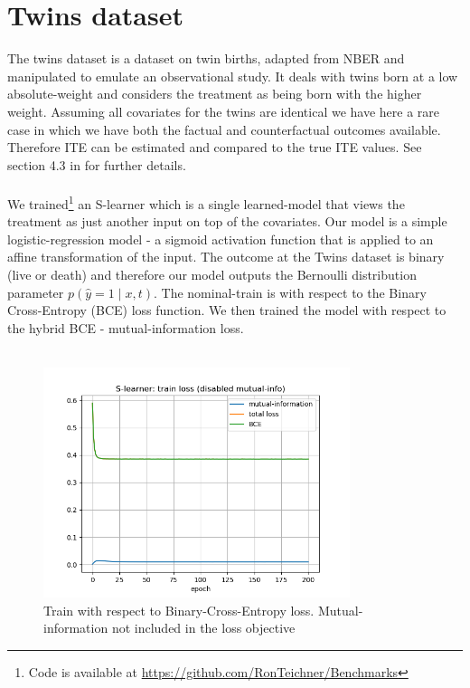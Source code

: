 \documentclass[oneside,12pt]{article}
\begin{document}
\section{Twins dataset}\label{sec:twins}
%
The twins dataset is a dataset on twin births, adapted from NBER and manipulated to emulate an observational study. It deals with twins born at a low absolute-weight and considers the treatment as being born with the higher weight. Assuming all covariates for the twins are identical we have here a rare case in which we have both the factual and counterfactual outcomes available. Therefore ITE can be estimated and compared to the true ITE values. See section 4.3 in \cite{NIPS2017_7223} for further details.\\\\
%
We trained\footnote{Code is available at \href{https://github.com/RonTeichner/Benchmarks}{https://github.com/RonTeichner/Benchmarks}} an S-learner \cite{Knzel4156} which is a single learned-model that views the treatment as just another input on top of the covariates. Our model is a simple logistic-regression model - a sigmoid activation function that is applied to an affine transformation of the input. The outcome at the Twins dataset is binary (live or death) and therefore our model outputs the Bernoulli distribution parameter $p(\hat{y}=1 \mid x,t)$. The nominal-train is with respect to the Binary Cross-Entropy (BCE) loss function. We then trained the model with respect to the hybrid BCE - mutual-information loss.\\\\
%
\begin{figure}
    \centering
        \includegraphics[width=0.8\textwidth]{./train_loss_disableMi}
        \caption{\label{fig:train_loss_disableMi}Train with respect to Binary-Cross-Entropy loss. Mutual-information not included in the loss objective}
\end{figure}
\end{document}
